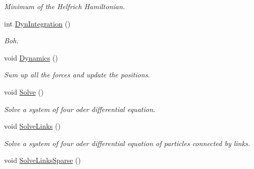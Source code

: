 \begin{DoxyCompactItemize}
\begin{DoxyCompactList}\small\item\em Minimum of the Helfrich Hamiltonian. \end{DoxyCompactList}\item 
int \hyperlink{classForces_affd222b3ce256a0c538341cc4d81865e}{Dyn\+Integration} ()\hypertarget{classForces_affd222b3ce256a0c538341cc4d81865e}{}\label{classForces_affd222b3ce256a0c538341cc4d81865e}

\begin{DoxyCompactList}\small\item\em Boh. \end{DoxyCompactList}\item 
void \hyperlink{classForces_a338adbdaecf3f72150ce3e88ec710bf1}{Dynamics} ()\hypertarget{classForces_a338adbdaecf3f72150ce3e88ec710bf1}{}\label{classForces_a338adbdaecf3f72150ce3e88ec710bf1}

\begin{DoxyCompactList}\small\item\em Sum up all the forces and update the positions. \end{DoxyCompactList}\item 
void \hyperlink{classForces_a941bab4d0655ea3e774cd525e664be52}{Solve} ()
\begin{DoxyCompactList}\small\item\em Solve a system of four oder differential equation. \end{DoxyCompactList}\item 
void \hyperlink{classForces_ac6b917be683f5ceaeec62edbf9472511}{Solve\+Links} ()
\begin{DoxyCompactList}\small\item\em Solve a system of four oder differential equation of particles connected by links. \end{DoxyCompactList}\item 
void \hyperlink{classForces_a35266508f74e6ca08000446ebbd62fc6}{Solve\+Links\+Sparse} ()\hypertarget{classForces_a35266508f74e6ca08000446ebbd62fc6}{}\label{classForces_a35266508f74e6ca08000446ebbd62fc6}


\end{DoxyCompactItemize}
